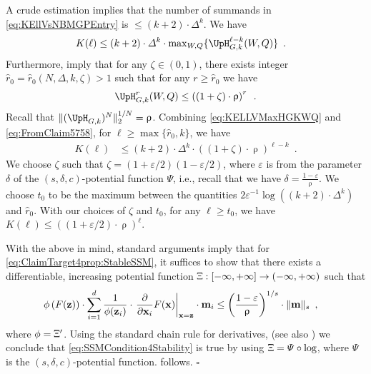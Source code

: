 \documentclass[11pt,reqno]{amsart}
\numberwithin{equation}{section}
\newcommand{\applegreen}[1]{ {\color{applegreen}#1}}
\newcommand{\amethyst}[1]{{\color{amethyst}#1} }
\newcommand{\blue}[1]{{\color{blue}#1}}
\newcommand{\bluepigment}[1]{{\color{blue(pigment)}#1}}
\newcommand{\bostonuniversityred}[1]{{\color{bostonuniversityred}#1}}
\newcommand{\capri}[1]{{\color{capri}#1}}
\newcommand{\cadmiumgreen}[1]{{\color{cadmiumgreen}#1}}
\newcommand{\cadmiumorange}[1]{{\color{cadmiumorange}#1}}
\newcommand{\darkmagenta}[1]{{\color{darkmagenta}#1}}
\newcommand{\goldenbrown}[1]{{\color{goldenbrown}#1}}
\newcommand{\heliotrope}[1]{{\color{heliotrope}#1}}
\newcommand{\red}[1]{{\color{red}#1}}
\newcommand{\maxDeg}{{\Delta}}
\newcommand{\potF}{{\Psi}}
\newcommand{\pfs}{\darkmagenta{s}}
\newcommand{\norm}[2]{\goldenbrown{\|} #1 \goldenbrown{\|}_{#2}}
\newcommand{\nnorm}[3]{\goldenbrown{\|} #1\goldenbrown{\|}^{#2}_{#3}}
\newcommand{\NBMatrix}{\cadmiumgreen{\UpH}_{G,\kk}}
\renewcommand{\applegreen}[1]{#1}
\renewcommand{\amethyst}[1]{#1}
\renewcommand{\blue}[1]{#1}
\renewcommand{\bluepigment}[1]{#1}
\renewcommand{\bostonuniversityred}[1]{#1}
\renewcommand{\capri}[1]{#1}
\renewcommand{\cadmiumgreen}[1]{#1}
\renewcommand{\cadmiumorange}[1]{#1}
\renewcommand{\darkmagenta}[1]{#1}
\renewcommand{\goldenbrown}[1]{#1}
\renewcommand{\heliotrope}[1]{#1}
\renewcommand{\red}[1]{#1}
\newcommand{\ki}{\capri{i}}
\newcommand{\kK}{\bluepigment{K}}
\newcommand{\kk}{\bluepigment{k}}
\newcommand{\kell}{{\color{green(pigment)}\ell}}%
\newcommand{\kQ}{\amethyst{Q}}
\newcommand{\kr}{\bostonuniversityred{r}}%
\newcommand{\kt}{\cadmiumorange{t}}
\newcommand{\kW}{\blue{W}}
\newcommand{\kx}{\heliotrope{x}}
\newcommand{\kz}{\cadmiumgreen{z}}
\renewcommand{\ki}{i}
\renewcommand{\kK}{K}
\renewcommand{\kk}{k}
\renewcommand{\kell}{\ell}
\renewcommand{\kQ}{Q}
\renewcommand{\kr}{r}
\renewcommand{\kt}{t}
\renewcommand{\kW}{W}
\renewcommand{\kx}{x}
\renewcommand{\kz}{z}
\newcommand{\SingBound}{\uprho}
\begin{document}
A crude estimation implies that the number of summands in 
\eqref{eq:KEllVsNBMGPEntry} is $\leq (\kk+2)\cdot \maxDeg^{\kk}$. 
We have
\begin{align}\label{eq:KELLVMaxHGKWQ}
\kK(\kell) &\leq (\kk+2)\cdot \maxDeg^{\kk} \cdot \max\nolimits_{\kW,\kQ}\{ \NBMatrix^{\kell-\kk}(\kW,\kQ)\}
 \enspace.
\end{align}
% 
Furthermore,  imply that for any $\zeta\in (0,1)$,
 there exists integer $\hat{\kr}_0=\hat{\kr}_0(N,\maxDeg, \kk, \zeta)>1$ such that for any $\kr \geq \hat{\kr}_0$ we have
 \begin{align}\label{eq:FromClaim5758}
\NBMatrix^{\kr}(\kW,\kQ) \leq \left( (1+\zeta)\cdot \SingBound \right)^{\kr}\enspace.
 \end{align}
Recall that $\nnorm{ (\NBMatrix)^N}{1/N}{2}=\SingBound$.
% 
Combining \eqref{eq:KELLVMaxHGKWQ} and \eqref{eq:FromClaim5758}, for $\kell\geq \max\{\hat{\kr}_0,\kk\}$, we have 
\begin{align}
\kK(\kell) & \leq (\kk+2)\cdot \maxDeg^{\kk}\cdot \left( (1+\zeta)\cdot \SingBound \right)^{\kell-\kk} \enspace. 
\end{align}
We choose $\zeta$ such that $\zeta=(1+\varepsilon/2)(1-\varepsilon/2)$, where $\varepsilon$ is from the 
parameter $\delta$ of the $(\pfs,\delta,c)$-potential function $\potF$, i.e., recall that we have $\delta= \frac{1-\varepsilon}{\SingBound}$. 
We choose $\kt_0$ to be the maximum between the quantities $2\varepsilon^{-1}\log((\kk+2)\cdot \maxDeg^{\kk})$ 
and $\hat{\kr}_0$. 
With our choices of $\zeta$ and $\kt_0$, for any $\kell\geq \kt_0$, we have 
$\kK(\kell)\leq \left((1+\varepsilon/2)\cdot \SingBound\right)^{\kell}$.

 
 
 
With the above in mind, standard arguments imply that  for \eqref{eq:ClaimTarget4prop:StableSSM}, it suffices to show 
 that there exists a differentiable, increasing potential function  $\Upxi:[-\infty,+\infty]\to(-\infty,+\infty)$ such that 
\begin{align}\label{eq:SSMCondition4Stability}
\phi\left( F({\bf \kz})\right)\cdot \sum^d_{\ki=1} \frac{1}{\phi({\bf \kz}_{\ki})}\cdot \left. \frac{\partial}{\partial {\bf \kx}_{\ki}}F({\bf \kx})\right|_{{\bf \kx}={\bf \kz}} \cdot {\bf m}_{\ki}
&\leq \left( \frac{1-\varepsilon}{\SingBound}\right)^{1/\pfs} \cdot \norm{ {\bf m}}{\pfs}\enspace, 
\end{align}
where $\phi=\Upxi'$. 
%
Using the standard chain rule for derivatives, (see also  \cite{VigodaSpectralInd}) we conclude that \eqref{eq:SSMCondition4Stability} is true by using 
$\Upxi=\potF\circ\log$, where $\potF$ is the $(\pfs,\delta,c)$-potential function.  follows. 
%
\hfill $\square$
\end{document}
